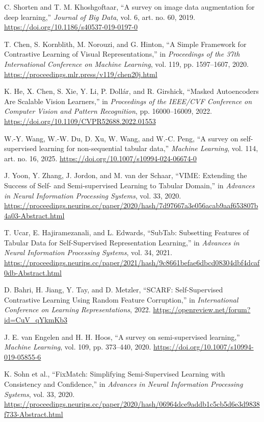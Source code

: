  C. Shorten and T. M. Khoshgoftaar, ``A survey on image data augmentation for deep learning,'' \textit{Journal of Big Data}, vol. 6, art. no. 60, 2019. \url{https://doi.org/10.1186/s40537-019-0197-0}

 T. Chen, S. Kornblith, M. Norouzi, and G. Hinton, ``A Simple Framework for Contrastive Learning of Visual Representations,'' in \textit{Proceedings of the 37th International Conference on Machine Learning}, vol. 119, pp. 1597--1607, 2020. \url{https://proceedings.mlr.press/v119/chen20j.html}

 K. He, X. Chen, S. Xie, Y. Li, P. Dollár, and R. Girshick, ``Masked Autoencoders Are Scalable Vision Learners,'' in \textit{Proceedings of the IEEE/CVF Conference on Computer Vision and Pattern Recognition}, pp. 16000--16009, 2022. \url{https://doi.org/10.1109/CVPR52688.2022.01553}

 W.-Y. Wang, W.-W. Du, D. Xu, W. Wang, and W.-C. Peng, ``A survey on self-supervised learning for non-sequential tabular data,'' \textit{Machine Learning}, vol. 114, art. no. 16, 2025. \url{https://doi.org/10.1007/s10994-024-06674-0}

 J. Yoon, Y. Zhang, J. Jordon, and M. van der Schaar, ``VIME: Extending the Success of Self- and Semi-supervised Learning to Tabular Domain,'' in \textit{Advances in Neural Information Processing Systems}, vol. 33, 2020. \url{https://proceedings.neurips.cc/paper/2020/hash/7d97667a3e056acab9aaf653807b4a03-Abstract.html}

 T. Ucar, E. Hajiramezanali, and L. Edwards, ``SubTab: Subsetting Features of Tabular Data for Self-Supervised Representation Learning,'' in \textit{Advances in Neural Information Processing Systems}, vol. 34, 2021. \url{https://proceedings.neurips.cc/paper/2021/hash/9c8661befae6dbcd08304dbf4dcaf0db-Abstract.html}

 D. Bahri, H. Jiang, Y. Tay, and D. Metzler, ``SCARF: Self-Supervised Contrastive Learning Using Random Feature Corruption,'' in \textit{International Conference on Learning Representations}, 2022. \url{https://openreview.net/forum?id=CuV_qYkmKb3}

 J. E. van Engelen and H. H. Hoos, ``A survey on semi-supervised learning,'' \textit{Machine Learning}, vol. 109, pp. 373--440, 2020. \url{https://doi.org/10.1007/s10994-019-05855-6}

 K. Sohn et al., ``FixMatch: Simplifying Semi-Supervised Learning with Consistency and Confidence,'' in \textit{Advances in Neural Information Processing Systems}, vol. 33, 2020. \url{https://proceedings.neurips.cc/paper/2020/hash/06964dce9addb1c5cb5d6e3d9838f733-Abstract.html}

